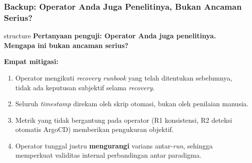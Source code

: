 {
\usebackgroundtemplate{\backgroundcontent}
\begin{frame}
    \frametitle{Backup: Operator Anda Juga Penelitinya, Bukan Ancaman Serius?}
    \vspace{0.20cm}
    \begin{beamercolorbox}[wd=\textwidth, sep=0.20cm, center, rounded=true]{structure}
        \small\bfseries Pertanyaan penguji: Operator Anda juga penelitinya. Mengapa ini bukan ancaman serius?
    \end{beamercolorbox}
    \vspace{0.12cm}
    \textbf{Empat mitigasi:}
    \begin{enumerate}
        \item Operator mengikuti \textit{recovery runbook} yang telah ditentukan sebelumnya, tidak ada keputusan subjektif selama \textit{recovery}.
        \item Seluruh \textit{timestamp} direkam oleh skrip otomasi, bukan oleh penilaian manusia.
        \item Metrik yang tidak bergantung pada operator (R1 konsistensi, R2 deteksi otomatis ArgoCD) memberikan pengukuran objektif.
        \item Operator tunggal justru \textbf{mengurangi} varians antar-\textit{run}, sehingga memperkuat validitas internal perbandingan antar paradigma.
    \end{enumerate}
    \vspace{0.08cm}
\end{frame}
}

